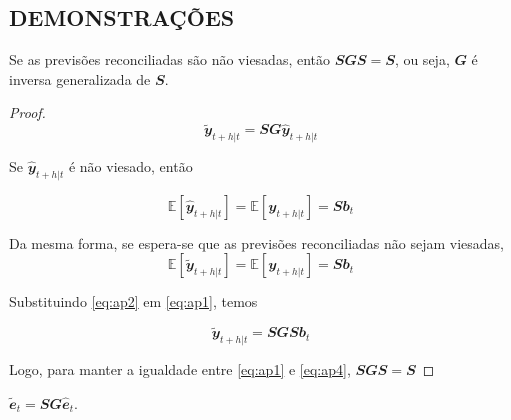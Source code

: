 \postextual

\begin{apendicesenv}
\partapendices

\chapter{DEMONSTRAÇÕES} \label{apendice_a}

\begin{lemma}
  \label{lema1}

  Se as previsões reconciliadas são não viesadas, então $\mathbfit{SGS=S}$, ou seja, $\mathbfit{G}$ é inversa generalizada de $\mathbfit{S}$.

\end{lemma}

\begin{proof}
  \begin{equation} \label{eq:ap1}
    \mathbfit{\tilde{y}}_{t+h|t} = \mathbfit{SG\hat{y}}_{t+h|t} 
  \end{equation}

  Se $\mathbfit{\hat{y}}_{t+h|t}$ é não viesado, então 

  \begin{equation} \label{eq:ap2}
      \mathbb{E}[\mathbfit{\hat{y}}_{t+h|t}] = \mathbb{E}[\mathbfit{y}_{t+h|t}] = \mathbfit{Sb}_t
  \end{equation}

  Da mesma forma, se espera-se que as previsões reconciliadas não sejam viesadas,
  \begin{equation} \label{eq:ap3}
      \mathbb{E}[\mathbfit{\tilde{y}}_{t+h|t}] = \mathbb{E}[\mathbfit{y}_{t+h|t}] = \mathbfit{Sb}_t
  \end{equation}

  Substituindo \eqref{eq:ap2} em \eqref{eq:ap1}, temos

  \begin{equation} \label{eq:ap4}
      \mathbfit{\tilde{y}}_{t+h|t} = \mathbfit{SGSb}_t 
  \end{equation}

  Logo, para manter a igualdade entre \eqref{eq:ap1} e \eqref{eq:ap4}, $\mathbfit{SGS=S}$

\end{proof}

\begin{lemma}
  \label{lema2}

  $\mathbfit{\tilde{e}}_t = \mathbfit{SG\hat{e}}_t$.


\end{lemma}
\end{apendicesenv}
